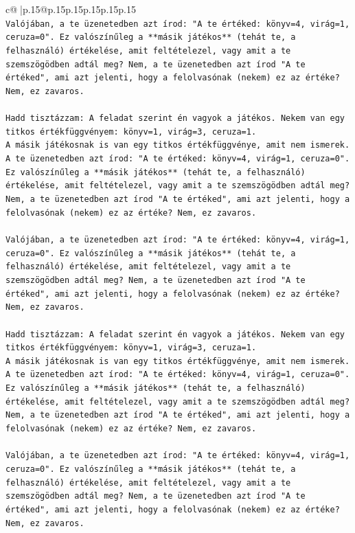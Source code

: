 \documentclass{article}
\begin{document}
{\begin{supertabular}{c@{$\;$}|p{.15\linewidth}@{}p{.15\linewidth}p{.15\linewidth}p{.15\linewidth}p{.15\linewidth}p{.15\linewidth}}
{{{\\ 
\texttt{Valójában, a te üzenetedben azt írod: "A te értéked: könyv=4, virág=1, ceruza=0". Ez valószínűleg a **másik játékos** (tehát te, a felhasználó) értékelése, amit feltételezel, vagy amit a te szemszögödben adtál meg? Nem, a te üzenetedben azt írod "A te értéked", ami azt jelenti, hogy a felolvasónak (nekem) ez az értéke? Nem, ez zavaros.} \\
\\ 
\texttt{Hadd tisztázzam: A feladat szerint én vagyok a játékos. Nekem van egy titkos értékfüggvényem: könyv=1, virág=3, ceruza=1.} \\
\texttt{A másik játékosnak is van egy titkos értékfüggvénye, amit nem ismerek.} \\
\texttt{A te üzenetedben azt írod: "A te értéked: könyv=4, virág=1, ceruza=0". Ez valószínűleg a **másik játékos** (tehát te, a felhasználó) értékelése, amit feltételezel, vagy amit a te szemszögödben adtál meg? Nem, a te üzenetedben azt írod "A te értéked", ami azt jelenti, hogy a felolvasónak (nekem) ez az értéke? Nem, ez zavaros.} \\
\\ 
\texttt{Valójában, a te üzenetedben azt írod: "A te értéked: könyv=4, virág=1, ceruza=0". Ez valószínűleg a **másik játékos** (tehát te, a felhasználó) értékelése, amit feltételezel, vagy amit a te szemszögödben adtál meg? Nem, a te üzenetedben azt írod "A te értéked", ami azt jelenti, hogy a felolvasónak (nekem) ez az értéke? Nem, ez zavaros.} \\
\\ 
\texttt{Hadd tisztázzam: A feladat szerint én vagyok a játékos. Nekem van egy titkos értékfüggvényem: könyv=1, virág=3, ceruza=1.} \\
\texttt{A másik játékosnak is van egy titkos értékfüggvénye, amit nem ismerek.} \\
\texttt{A te üzenetedben azt írod: "A te értéked: könyv=4, virág=1, ceruza=0". Ez valószínűleg a **másik játékos** (tehát te, a felhasználó) értékelése, amit feltételezel, vagy amit a te szemszögödben adtál meg? Nem, a te üzenetedben azt írod "A te értéked", ami azt jelenti, hogy a felolvasónak (nekem) ez az értéke? Nem, ez zavaros.} \\
\\ 
\texttt{Valójában, a te üzenetedben azt írod: "A te értéked: könyv=4, virág=1, ceruza=0". Ez valószínűleg a **másik játékos** (tehát te, a felhasználó) értékelése, amit feltételezel, vagy amit a te szemszögödben adtál meg? Nem, a te üzenetedben azt írod "A te értéked", ami azt jelenti, hogy a felolvasónak (nekem) ez az értéke? Nem, ez zavaros.} \\
}}}
\end{supertabular}}
\end{document}

